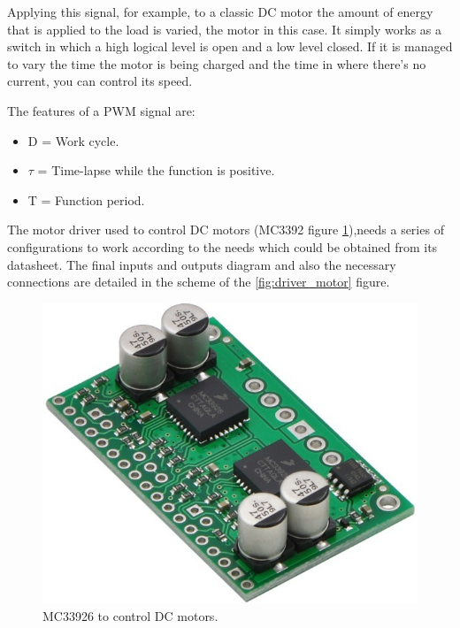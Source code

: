 Applying this signal, for example, to a classic DC motor the amount of energy that is applied to the load is varied, the motor in this case. It simply works as a switch in which a high logical level is open and a low level closed. If it is managed to vary the time the motor is being charged and the time in where there’s no current, you can control its speed. \newline

The features of a PWM signal are: 
\begin{itemize}
	\item D = Work cycle.
	\item $\tau$ = Time-lapse while the function is positive.
	\item T = Function period.
\end{itemize}


The motor driver used to control DC motors (MC3392 figure \ref{fig:driver_motor_fisico}),needs a series of configurations to work according to the needs which could be obtained from its datasheet. The final inputs and outputs diagram and also the necessary connections are detailed in the scheme of the \ref{fig:driver_motor} figure.


\begin{figure}[H]
	\center
	\includegraphics[trim = 0mm 0cm 0mm 0cm, clip,scale=0.4]{imagenes/Balancing_robot/driver_motor.jpg}
	\caption{MC33926 to control DC motors.}
	\label{fig:driver_motor_fisico}
\end{figure}


